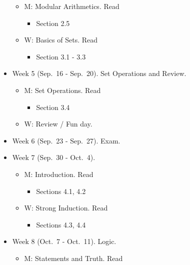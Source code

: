 \documentclass[
]{article}
\providecommand{\tightlist}{%
  \setlength{\itemsep}{0pt}\setlength{\parskip}{0pt}}
\begin{document}
\begin{itemize}
  \begin{itemize}
  \tightlist
  \item
    M: Modular Arithmetics. Read

    \begin{itemize}
    \tightlist
    \item
      Section 2.5
    \end{itemize}
  \item
    W: Basics of Sets. Read

    \begin{itemize}
    \tightlist
    \item
      Section 3.1 - 3.3
    \end{itemize}
  \end{itemize}
\item
  Week 5 (Sep.~16 - Sep.~20). Set Operations and Review.

  \begin{itemize}
  \tightlist
  \item
    M: Set Operations. Read

    \begin{itemize}
    \tightlist
    \item
      Section 3.4
    \end{itemize}
  \item
    W: Review / Fun day.
  \end{itemize}
\item
  Week 6 (Sep.~23 - Sep.~27). Exam.
\item
  Week 7 (Sep.~30 - Oct.~4).

  \begin{itemize}
  \tightlist
  \item
    M: Introduction. Read

    \begin{itemize}
    \tightlist
    \item
      Sections 4.1, 4.2
    \end{itemize}
  \item
    W: Strong Induction. Read

    \begin{itemize}
    \tightlist
    \item
      Sections 4.3, 4.4
    \end{itemize}
  \end{itemize}
\item
  Week 8 (Oct.~7 - Oct.~11). Logic.

  \begin{itemize}
  \tightlist
  \item
    M: Statements and Truth. Read


\end{itemize}
\end{itemize}
\end{document}
